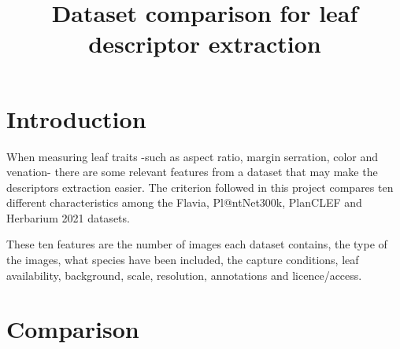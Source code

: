 \documentclass[11pt,a4paper]{article}
\title{\vspace{-1.5cm}Dataset comparison for leaf descriptor extraction}
\author{}
\date{}
\begin{document}
\maketitle
\vspace{-1.5cm}

\section*{Introduction}

When measuring leaf traits -such as aspect ratio, margin serration, color and venation-
there are some relevant features from a dataset that may make the descriptors extraction easier.
The criterion followed in this project compares ten different characteristics among the Flavia,
Pl@ntNet300k, PlanCLEF and Herbarium 2021 datasets.

These ten features are the number of images each dataset contains, the type of the images,
what species have been included, the capture conditions, leaf availability, background, scale,
resolution, annotations and licence/access.

\section*{Comparison}

\begingroup
\scriptsize
\renewcommand{\arraystretch}{1.25}
\setlength{\tabcolsep}{3.5pt}
\end{document}
